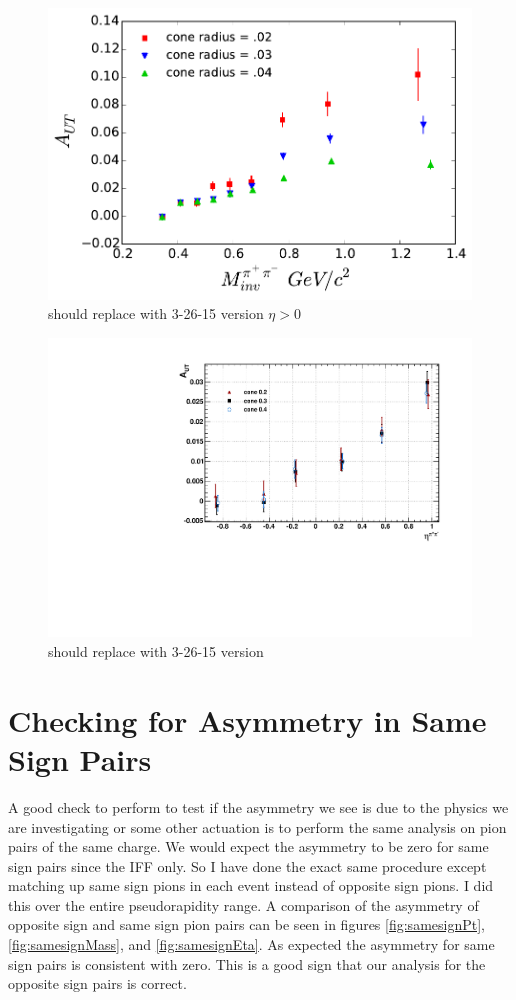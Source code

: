 \documentclass[abstract = on,listof=totoc, bibliography=totoc]{scrreprt}
\newcommand{\mpair}{M_{inv}^{\pi^+\pi^-}}
\newcommand{\etapair}{\eta^{\pi^+\pi^-}}
\begin{document}
\begin{figure}
\begin{center}
\includegraphics[width = .8\textwidth]{allConeAsymsVs_Mass_8_24_15_HiEta}
\caption[Asymmetry vs $\mpair$ for different cone radii]{should replace with 3-26-15 version $\eta > 0$}
\label{fig:allConesMass}
\end{center}
\end{figure}

\begin{figure}
\begin{center}
\includegraphics[width = .7\textwidth]{allConesEta}
\caption[Asymmetry vs $\etapair$ for different cone radii]{should replace with 3-26-15 version}
\label{fig:allConesEta}
\end{center}
\end{figure}





\section{Checking for Asymmetry in Same Sign Pairs}
A good check to perform to test if the asymmetry we see is due to the physics we are investigating or some other actuation is to perform the same analysis on pion pairs of the same charge. We would expect the asymmetry to be zero for same sign pairs since the IFF only. So I have done the exact same procedure except matching up same sign pions in each event instead of opposite sign pions. I did this over the entire pseudorapidity range. A comparison of the asymmetry of opposite sign and same sign pion pairs can be seen in figures \ref{fig:samesignPt}, \ref{fig:samesignMass}, and \ref{fig:samesignEta}. As expected the asymmetry for same sign pairs is consistent with zero. This is a good sign that our analysis for the opposite sign pairs is correct. 
\end{document}
